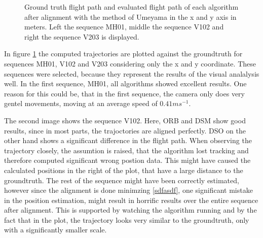 	\begin{figure}%
    \centering
    \qquad
	\qquad
    \caption{
	Ground truth flight path and evaluated flight path of each algorithm after alignment with the method of Umeyama in the x and y axis in meters. 
	Left the sequence MH01, middle the sequence V102 and right the sequence V203 is displayed.
	}%
    \label{fig:flight_path}%
	\end{figure}
	
	In figure \ref{fig:flight_path} the computed trajectories are plotted against the groundtruth for sequences MH01, V102 and V203 considering only the 
	x and y coordinate. These sequences 
	were selected, because they represent the results of the visual analalysis well. In the first sequence, MH01, all algorithms showed excellent results. 
	One reason for this could be, that in the first sequence, the camera only does very gentel movements, moving at an average speed of $0.41 ms^{-1}$. 
	
	The second image shows the sequence V102. Here, ORB and DSM show good results, since in most parts, the trajoctories are aligned perfectly. DSO on the 
	other hand shows a significant difference in the flight path. When observing the trajectory closely, the assumtion is raised, that the algorithm lost tracking 
	and therefore computed significant wrong postion data. This might have caused the calculated positions in the right of the plot, that have a large distance to 
	the groundtruth. The rest of the sequence might have been correctly estimated, however since the alignment is done minimzing \ref{sdfasdf}, one significant 
	mistake in the position estimation, might result in horrific results over the entire sequence after alignment. This is supported by watching the algorithm running
	and by the fact that in the plot, the trajectory looks very similar to the groundtruth, only with a significantly smaller scale.
	
